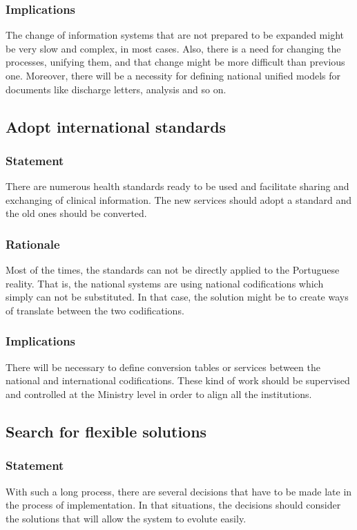 \subsubsection{Implications}
The change of information systems that are not prepared to be expanded might be very slow and complex, in most cases. Also, there is a need for changing the processes, unifying them, and that change might be more difficult than previous one. Moreover, there will be a necessity for defining national unified models for documents like discharge letters, analysis and so on.


\subsection{Adopt international standards}

\subsubsection{Statement}
There are numerous health standards ready to be used and facilitate sharing and exchanging of clinical information. The new services should adopt a standard and the old ones should be converted.
\subsubsection{Rationale}
Most of the times, the standards can not be directly applied to the Portuguese reality. That is, the national systems are using national codifications which simply can not be substituted. In that case, the solution might be to create ways of translate between the two codifications.
\subsubsection{Implications}
There will be necessary to define conversion tables or services between the national and international codifications. These kind of work should be supervised and controlled at the Ministry level in order to align all the institutions.


\subsection{Search for flexible solutions}

\subsubsection{Statement}
With such a long process, there are several decisions that have to be made late in the process of implementation. In that situations, the decisions should consider the solutions that will allow the system to evolute easily.
